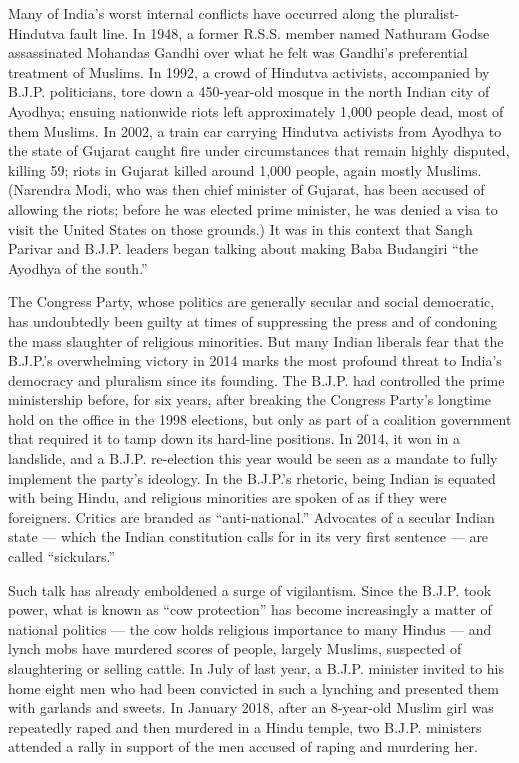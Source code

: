 Many of India's worst internal conflicts have occurred along the
pluralist-Hindutva fault line. In 1948, a former R.S.S. member named
Nathuram Godse assassinated Mohandas Gandhi over what he felt was
Gandhi's preferential treatment of Muslims. In 1992, a crowd of Hindutva
activists, accompanied by B.J.P. politicians, tore down a 450-year-old
mosque in the north Indian city of Ayodhya; ensuing nationwide riots
left approximately 1,000 people dead, most of them Muslims. In 2002, a
train car carrying Hindutva activists from Ayodhya to the state of
Gujarat caught fire under circumstances that remain highly disputed,
killing 59; riots in Gujarat killed around 1,000 people, again mostly
Muslims. (Narendra Modi, who was then chief minister of Gujarat, has
been accused of allowing the riots; before he was elected prime
minister, he was denied a visa to visit the United States on those
grounds.) It was in this context that Sangh Parivar and B.J.P. leaders
began talking about making Baba Budangiri ``the Ayodhya of the south.''

The Congress Party, whose politics are generally secular and social
democratic, has undoubtedly been guilty at times of suppressing the
press and of condoning the mass slaughter of religious minorities. But
many Indian liberals fear that the B.J.P.'s overwhelming victory in 2014
marks the most profound threat to India's democracy and pluralism since
its founding. The B.J.P. had controlled the prime ministership before,
for six years, after breaking the Congress Party's longtime hold on the
office in the 1998 elections, but only as part of a coalition government
that required it to tamp down its hard-line positions. In 2014, it won
in a landslide, and a B.J.P. re-election this year would be seen as a
mandate to fully implement the party's ideology. In the B.J.P.'s
rhetoric, being Indian is equated with being Hindu, and religious
minorities are spoken of as if they were foreigners. Critics are branded
as ``anti-national.'' Advocates of a secular Indian state --- which the
Indian constitution calls for in its very first sentence --- are called
``sickulars.''

Such talk has already emboldened a surge of vigilantism. Since the
B.J.P. took power, what is known as ``cow protection'' has become
increasingly a matter of national politics --- the cow holds religious
importance to many Hindus --- and lynch mobs have murdered scores of
people, largely Muslims, suspected of slaughtering or selling cattle. In
July of last year, a B.J.P. minister invited to his home eight men who
had been convicted in such a lynching and presented them with garlands
and sweets. In January 2018, after an 8-year-old Muslim girl was
repeatedly raped and then murdered in a Hindu temple, two B.J.P.
ministers attended a rally in support of the men accused of raping and
murdering her.

